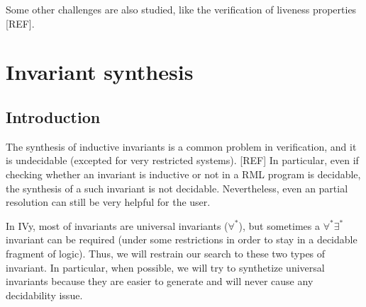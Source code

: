\documentclass[11pt,a4paper,oldfontcommands,openany]{memoir}
\begin{document}
    Some other challenges are also studied, like the verification of liveness properties [REF].


\chapter{Invariant synthesis}

    \section{Introduction}

    The synthesis of inductive invariants is a common problem in verification, and it is undecidable (excepted for very restricted systems). [REF]
    In particular, even if checking whether an invariant is inductive or not in a RML program is decidable, the synthesis of a such invariant is not decidable.
    Nevertheless, even an partial resolution can still be very helpful for the user.

    In IVy, most of invariants are universal invariants (\(\forall^*\)), but sometimes a \(\forall^*\exists^*\) invariant can be required (under some restrictions in order
    to stay in a decidable fragment of logic). Thus, we will restrain our search to these two types of invariant.
    In particular, when possible, we will try to synthetize universal invariants because they are easier to generate and will never cause any decidability issue.
    
\end{document}
